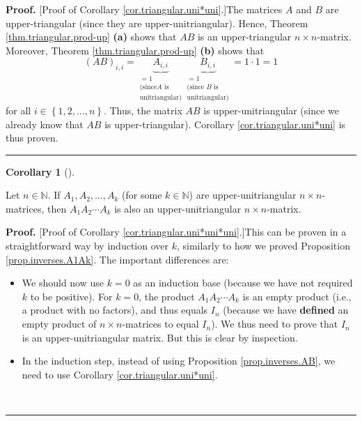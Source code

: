 \documentclass[numbers=enddot,12pt,final,onecolumn,notitlepage]{scrartcl}%
\theoremstyle{definition}
\newtheorem{coro}[theo]{Corollary}
\newenvironment{corollary}[1][]
{\begin{coro}[#1]\begin{leftbar}}
{\end{leftbar}\end{coro}}
\newenvironment{proof}[1][Proof]{\noindent\textbf{#1.} }{\ \rule{0.5em}{0.5em}}
\begin{document}
\begin{proof}
[Proof of Corollary \ref{cor.triangular.uni*uni}.]The matrices $A$ and $B$ are
upper-triangular (since they are upper-unitriangular). Hence, Theorem
\ref{thm.triangular.prod-up} \textbf{(a)} shows that $AB$ is an
upper-triangular $n\times n$-matrix. Moreover, Theorem
\ref{thm.triangular.prod-up} \textbf{(b)} shows that
\[
\left(  AB\right)  _{i,i}=\underbrace{A_{i,i}}_{\substack{=1\\\text{(since
}A\text{ is}\\\text{unitriangular)}}}\underbrace{B_{i,i}}%
_{\substack{=1\\\text{(since }B\text{ is}\\\text{unitriangular)}}}=1\cdot1=1
\]
for all $i\in\left\{  1,2,\ldots,n\right\}  $. Thus, the matrix $AB$ is
upper-unitriangular (since we already know that $AB$ is upper-triangular).
Corollary \ref{cor.triangular.uni*uni} is thus proven.
\end{proof}

\begin{corollary}
\label{cor.triangular.uni*uni*uni}Let $n\in\mathbb{N}$. If $A_{1},A_{2}%
,\ldots,A_{k}$ (for some $k\in\mathbb{N}$) are upper-unitriangular $n\times
n$-matrices, then $A_{1}A_{2}\cdots A_{k}$ is also an upper-unitriangular
$n\times n$-matrix.
\end{corollary}

\begin{proof}
[Proof of Corollary \ref{cor.triangular.uni*uni*uni}.]This can be proven in a
straightforward way by induction over $k$, similarly to how we proved
Proposition \ref{prop.inverses.A1Ak}. The important differences are:

\begin{itemize}
\item We should now use $k=0$ as an induction base (because we have not
required $k$ to be positive). For $k=0$, the product $A_{1}A_{2}\cdots A_{k}$
is an empty product (i.e., a product with no factors), and thus equals $I_{n}$
(because we have \textbf{defined} an empty product of $n\times n$-matrices to
equal $I_{n}$). We thus need to prove that $I_{n}$ is an upper-unitriangular
matrix. But this is clear by inspection.

\item In the induction step, instead of using Proposition
\ref{prop.inverses.AB}, we need to use Corollary \ref{cor.triangular.uni*uni}.
\end{itemize}
\end{proof}
\end{document}
